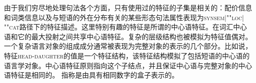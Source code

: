 由于我们穷尽地处理句法各个方面，只有使用过的特征的子集是相关的：配价信息和词类信息以及与短语的外在分布有关的某些形态句法属性表现为\textsc{synsem$|$""loc$|$""cat}路径下的特征描述。这里特别有趣的特征是所谓的中心语特征。在词汇中心语和它的最大投射之间共享中心语特征。复杂的层级结构也被模拟为特征值偶对。一个复杂语言对象的组成成分通常被表现为完整对象的表示的几个部分。比如说，特征\textsc{head-daughter}的值是一个特征结构，该特征结构模拟了包括短语的中心语的语言学对象。中心语特征原则指向这个子结点，并且保证中心语与完整对象的中心语特征是相同的。
\ea
{} \impl
{} 
\z
指称是由具有相同数字的盒子表示的。


